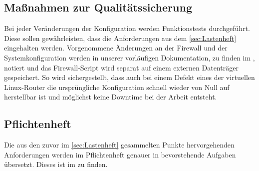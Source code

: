 \subsection{Maßnahmen zur Qualitätssicherung}
\label{sec:Qualitaetssicherung}
Bei jeder Veränderungen der Konfiguration werden Funktionstests durchgeführt. Diese sollen gewährleisten, dass die Anforderungen aus dem \ref{sec:Lastenheft} eingehalten werden. Vorgenommene Änderungen an der Firewall und der Systemkonfiguration werden in unserer vorläufigen Dokumentation, zu finden im , notiert und das Firewall-Script wird separat auf einem externen Datenträger gespeichert. So wird sichergestellt, dass auch bei einem Defekt eines der virtuellen Linux-Router die ursprüngliche Konfiguration schnell wieder von Null auf herstellbar ist und möglichst keine Downtime bei der Arbeit entsteht.

\subsection{Pflichtenheft}
\label{sec:Pflichtenheft}
Die aus den zuvor im \ref{sec:Lastenheft} gesammelten Punkte hervorgehenden Anforderungen werden im Pflichtenheft genauer in bevorstehende Aufgaben übersetzt. Dieses ist im  zu finden.


